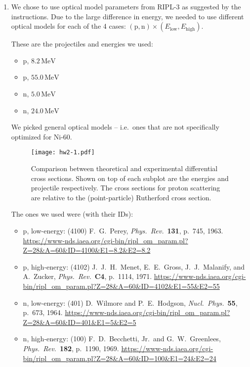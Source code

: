 \documentclass[fleqn, 12pt]{article}
\begin{document}
\begin{enumerate}
\item We chose to use optical model parameters from RIPL-3 as suggested by the
  instructions.  Due to the large difference in energy, we needed to use
  different optical models for each of the 4 cases:
  $(\mathrm p, \mathrm n) \times (E_{\text{low}}, E_{\text{high}})$.

  These are the projectiles and energies we used:
  \begin{itemize}
  \item p, $8.2\,\mathrm{MeV}$
  \item p, $55.0\,\mathrm{MeV}$
  \item n, $5.0\,\mathrm{MeV}$
  \item n, $24.0\,\mathrm{MeV}$
  \end{itemize}

  We picked general optical models -- i.e.\ ones that are not specifically
  optimized for Ni-60.

  \begin{figure}
    \centering
    \texttt{[image: hw2-1.pdf]}
    \caption{Comparison between theoretical and experimental differential
      cross sections.  Shown on top of each subplot are the energies and
      projectile respectively.  The cross sections for proton scattering are
      relative to the (point-particle) Rutherford cross section.}
    \label{fig:compare}
  \end{figure}

  The ones we used were (with their IDs):
  \begin{itemize}
  \item p, low-energy:
    (4100) F.\ G.\ Perey, \textit{Phys.\ Rev.}\ \textbf{131}, p.\ 745, 1963.
    \url{https://www-nds.iaea.org/cgi-bin/ripl_om_param.pl?Z=28&A=60&ID=4100&E1=8.2&E2=8.2}
  \item p, high-energy:
    (4102) J.\ J.\ H.\ Menet, E.\ E.\ Gross, J.\ J.\ Malanify, and A.\ Zucker,
    \textit{Phys.\ Rev.}\ \textbf{C4}, p.\ 1114, 1971.
    \url{https://www-nds.iaea.org/cgi-bin/ripl_om_param.pl?Z=28&A=60&ID=4102&E1=55&E2=55}
  \item n, low-energy:
    (401) D.\ Wilmore and P.\ E.\ Hodgson,
    \textit{Nucl.\ Phys.}\ \textbf{55}, p.\ 673, 1964.
    \url{https://www-nds.iaea.org/cgi-bin/ripl_om_param.pl?Z=28&A=60&ID=401&E1=5&E2=5}
  \item n, high-energy:
    (100) F.\ D.\ Becchetti, Jr.\ and G.\ W.\ Greenlees,
    \textit{Phys.\ Rev.}\ \textbf{182}, p.\ 1190, 1969.
    \url{https://www-nds.iaea.org/cgi-bin/ripl_om_param.pl?Z=28&A=60&ID=100&E1=24&E2=24}
  \end{itemize}


\end{enumerate}
\end{document}
